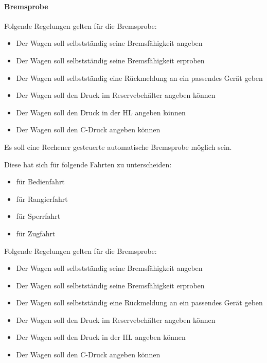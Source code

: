 \paragraph{Bremsprobe} \par
Folgende Regelungen gelten für die Bremsprobe:
\begin{itemize}
    \item Der Wagen soll selbstständig seine Bremsfähigkeit angeben
    \item Der Wagen soll selbstständig seine Bremsfähigkeit erproben
    \item Der Wagen soll selbstständig eine Rückmeldung an ein passendes Gerät geben
    \item Der Wagen soll den Druck im Reservebehälter angeben können
    \item Der Wagen soll den Druck in der HL angeben können
    \item Der Wagen soll den C-Druck angeben können
\end{itemize}
\begin{feat}
Es soll eine Rechener gesteuerte automatische Bremsprobe möglich sein.
\end{feat}
\begin{rem} Diese hat sich für folgende Fahrten zu unterscheiden:
\begin{itemize}
    \item für Bedienfahrt
    \item für Rangierfahrt
    \item für Sperrfahrt
    \item für Zugfahrt
\end{itemize}
\end{rem}
\begin{rem}
Folgende Regelungen gelten für die Bremsprobe:
\begin{itemize}
    \item Der Wagen soll selbstständig seine Bremsfähigkeit angeben
    \item Der Wagen soll selbstständig seine Bremsfähigkeit erproben
    \item Der Wagen soll selbstständig eine Rückmeldung an ein passendes Gerät geben
    \item Der Wagen soll den Druck im Reservebehälter angeben können
    \item Der Wagen soll den Druck in der HL angeben können
    \item Der Wagen soll den C-Druck angeben können
\end{itemize}
\end{rem}

